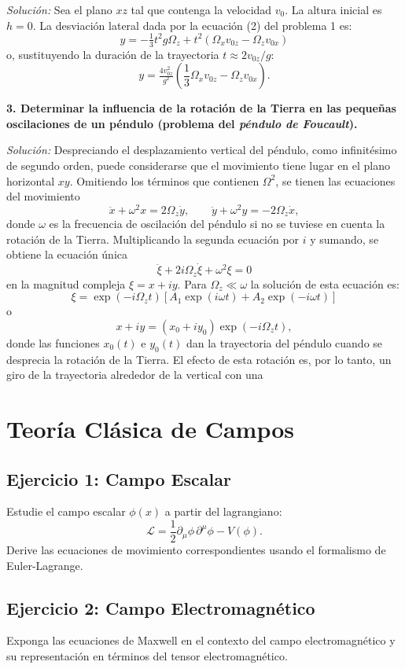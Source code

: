 \documentclass[12pt]{article}
\begin{document}
\textit{Solución:} Sea el plano $xz$ tal que contenga la velocidad $v_0$. La altura inicial es $h = 0$. La desviación lateral dada por la ecuación (2) del problema 1 es:
\[
y = -\tfrac{1}{3} t^2 g \Omega_z + t^2 ( \Omega_x v_{0z} - \Omega_z v_{0x} )
\]
o, sustituyendo la duración de la trayectoria $t \approx 2v_{0z}/g$:
\[
y = \tfrac{4v_{0z}^2}{g^2} (\frac{1}{3} \Omega_x v_{0z} - \Omega_z v_{0x} ).
\]

\vspace{1em}

\textbf{3. Determinar la influencia de la rotación de la Tierra en las pequeñas oscilaciones de un péndulo (problema del \textit{péndulo de Foucault}).}

\textit{Solución:} Despreciando el desplazamiento vertical del péndulo, como infinitésimo de segundo orden, puede considerarse que el movimiento tiene lugar en el plano horizontal $xy$. Omitiendo los términos que contienen $\Omega^2$, se tienen las ecuaciones del movimiento
\[
\ddot{x} + \omega^2 x = 2\Omega_z \dot{y}, \qquad \ddot{y} + \omega^2 y = -2\Omega_z \dot{x},
\]
donde $\omega$ es la frecuencia de oscilación del péndulo si no se tuviese en cuenta la rotación de la Tierra. Multiplicando la segunda ecuación por $i$ y sumando, se obtiene la ecuación única
\[
\ddot{\xi} + 2i\Omega_z \dot{\xi} + \omega^2 \xi = 0
\]
en la magnitud compleja $\xi = x + i y$. Para $\Omega_z \ll \omega$ la solución de esta ecuación es:
\[
\xi = \exp(-i\Omega_z t) [A_1 \exp(i\omega t) + A_2 \exp(-i\omega t)]
\]
o
\[
x + i y = (x_0 + i y_0) \exp(-i\Omega_z t),
\]
donde las funciones $x_0(t)$ e $y_0(t)$ dan la trayectoria del péndulo cuando se desprecia la rotación de la Tierra. El efecto de esta rotación es, por lo tanto, un giro de la trayectoria alrededor de la vertical con una

\section{Teoría Clásica de Campos}
\subsection{Ejercicio 1: Campo Escalar}
Estudie el campo escalar \(\phi(x)\) a partir del lagrangiano:
\[
\mathcal{L} = \frac{1}{2}\partial_\mu\phi\,\partial^\mu\phi - V(\phi).
\]
Derive las ecuaciones de movimiento correspondientes usando el formalismo de Euler-Lagrange.

\subsection{Ejercicio 2: Campo Electromagnético}
Exponga las ecuaciones de Maxwell en el contexto del campo electromagnético y su representación en términos del tensor electromagnético.
\end{document}
